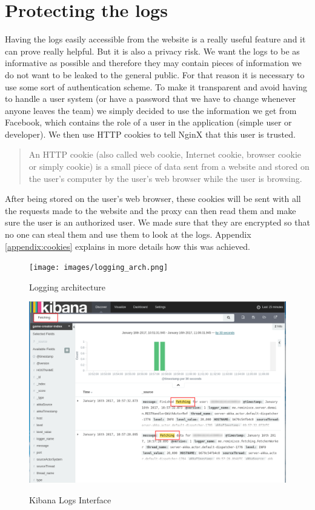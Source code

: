 \section{Protecting the logs}
Having the logs easily accessible from the website is a really useful feature and it can prove really helpful. But it is also a privacy risk. We want the logs to be as informative as possible and therefore they may contain pieces of information we do not want to be leaked to the general public. For that reason it is necessary to use some sort of authentication scheme. To make it transparent and avoid having to handle a user system (or have a password that we have to change whenever anyone leaves the team) we simply decided to use the information we get from Facebook, which contains the role of a user in the application (simple user or developer). We then use HTTP cookies to tell NginX that this user is trusted. \blockquote{An HTTP cookie (also called web cookie, Internet cookie, browser cookie or simply cookie) is a small piece of data sent from a website and stored on the user's computer by the user's web browser while the user is browsing.}\cite{cookie} After being stored on the user's web browser, these cookies will be sent with all the requests made to the website and the proxy can then read them and make sure the user is an authorized user. We made sure that they are encrypted so that no one can steal them and use them to look at the logs. Appendix \ref{appendix:cookies} explains in more details how this was achieved.
\begin{figure}
\centering
{\texttt{[image: images/logging\_arch.png]}}
\caption{Logging architecture}
\label{fig:loggingArch}
\end{figure}

\begin{figure}
\centering
{\includegraphics[width=6in]{images/kibana.png}}
\caption{Kibana Logs Interface}
\label{fig:kibana}
\end{figure}


